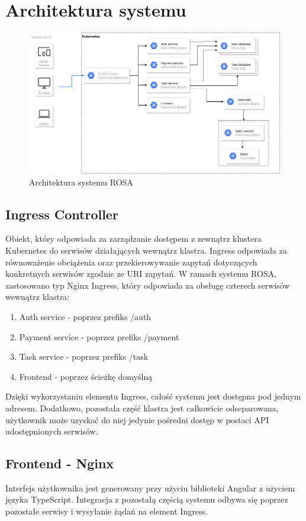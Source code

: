 \newpage
\chapter{Architektura systemu}
\begin{figure}[!ht]
    \centering
    \includegraphics[width=\textwidth]{images/arch.png}
    \caption{Architektura systemu ROSA}
    \label{fig:sys_arch}
\end{figure}
\section{Ingress Controller}
Obiekt, który odpowiada za zarządzanie dostępem z zewnątrz klustera Kubernetes do serwisów działających wewnątrz klastra. Ingress odpowiada za równoważenie obciążenia oraz przekierowywanie zapytań dotyczących konkretnych serwisów zgodnie ze URI zapytań. W ramach systemu ROSA, zastosowano typ Nginx Ingress, który odpowiada za obsługę czterech serwisów wewnątrz klastra:
\begin{enumerate}
    \item Auth service - poprzez prefiks /auth
    \item Payment service - poprzez prefiks /payment
    \item Task service - poprzez prefiks /task
    \item Frontend - poprzez ścieżkę domyślną
\end{enumerate}
Dzięki wykorzystaniu elementu Ingress, całość systemu jest dostępna pod jednym adresem. Dodatkowo, pozostała część klastra jest całkowicie odseparowana, użytkownik może uzyskać do niej jedynie pośredni dostęp w postaci API udostępnionych serwisów.
\section{Frontend - Nginx}
Interfejs użytkownika jest generowany przy użyciu biblioteki Angular z użyciem języka TypeScript. Integracja z pozostałą częścią systemu odbywa się poprzez pozostałe serwisy i wysyłanie żądań na element Ingress.

